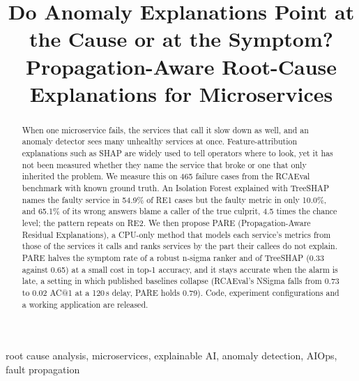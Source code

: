 \documentclass[conference]{IEEEtran}
\begin{document}
\title{Do Anomaly Explanations Point at the Cause or at the Symptom?
Propagation-Aware Root-Cause Explanations for Microservices}

\author{
\and
{}
}

\maketitle

\begin{abstract}
When one microservice fails, the services that call it slow down as well, and an
anomaly detector sees many unhealthy services at once. Feature-attribution
explanations such as SHAP are widely used to tell operators where to look, yet it
has not been measured whether they name the service that broke or one that only
inherited the problem. We measure this on 465 failure cases from the RCAEval
benchmark with known ground truth. An Isolation Forest explained with TreeSHAP names
the faulty service in 54.9\% of RE1 cases but the faulty metric in only 10.0\%, and
65.1\% of its wrong answers blame a caller of the true culprit, 4.5 times the chance
level; the pattern repeats on RE2. We then propose PARE (Propagation-Aware Residual
Explanations), a CPU-only method that models each service's metrics from those of
the services it calls and ranks services by the part their callees do not explain.
PARE halves the symptom rate of a robust n-sigma ranker and of TreeSHAP (0.33
against 0.65) at a small cost in top-1 accuracy, and it stays accurate when the
alarm is late, a setting in which published baselines collapse (RCAEval's NSigma
falls from 0.73 to 0.02 AC@1 at a 120\,s delay, PARE holds 0.79). Code, experiment
configurations and a working application are released.
\end{abstract}

\begin{IEEEkeywords}
root cause analysis, microservices, explainable AI, anomaly detection, AIOps,
fault propagation
\end{IEEEkeywords}
\end{document}
